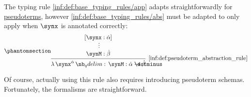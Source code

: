 \begin{definition}\label{def:pseudoterm_abstraction_rule}
  The typing rule \ref{inf:def:base_typing_rules/app} adapts straightforwardly for \hyperref[def:pseudoterm]{pseudoterms}, however \ref{inf:def:base_typing_rules/abs} must be adapted to only apply when \( \synx \) is annotated correctly:
  \begin{equation*}\taglabel[\ensuremath{ \logic{PsAbs}_\tau }]{inf:def:pseudoterm_abstraction_rule}
    \begin{prooftree}
      \hypo{ [\synx: \syn\alpha] }
      \ellipsis {} { \synM: \syn\beta }
      \infer1[\ref{inf:def:pseudoterm_abstraction_rule}]{ \qabs {\synx^{\syn\alpha}} \synM: \syn\alpha \synimplies \syn\beta }
    \end{prooftree}
  \end{equation*}
\end{definition}
\begin{comments}
  \item Of course, actually using this rule also requires introducing pseudoterm schemas. Fortunately, the formalisms are straightforward.
\end{comments}


